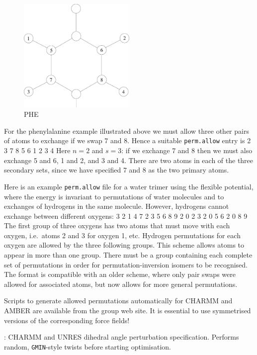 {{{\begin{figure}[hH]
\centerline{\includegraphics[width=0.5\textwidth]{PHE.eps}}
\caption{PHE}
\end{figure}

For the phenylalanine example illustrated above we must allow three other pairs of
atoms to exchange if we swap 7 and 8. Hence a suitable {\tt perm.allow} entry is
{
2 3
7 8 5 6 1 2 3 4
}
Here $n=2$ and $s=3$: if we exchange 7 and 8 then we must also exchange 5 and 6,
1 and 2, and 3 and 4. There are two atoms in each of the three secondary sets, 
since we have specified 7 and 8 as the two primary atoms.

Here is an example {\tt perm.allow} file for a water trimer using
the flexible {} potential, where the energy is invariant to permutations
of water molecules and to exchanges of hydrogens in the same molecule. However,
hydrogens cannot exchange between different oxygens:
{
3 2
1 4 7 2 3 5 6 8 9
2 0 
2 3
2 0 
5 6
2 0 
8 9
}
The first group of three oxygens has two atoms that must move with each oxygen,
i.e.~atoms 2 and 3 for oxygen 1, etc. Hydrogen permutations for each oxygen are
allowed by the three following groups. This scheme allows atoms to appear in more 
than one group. There must be a group containing each complete set of permutations
in order for permutation-inversion isomers to be recognised. The format
is compatible with an older scheme, where only pair swaps were allowed for
associated atoms, but now allows for more general permutations.

Scripts to generate allowed permutations automatically for CHARMM and AMBER are available from
the group web site. It is essential to use symmetrised versions of the corresponding
force fields! 

: CHARMM 
and UNRES dihedral angle perturbation specification.
Performs random, {\tt GMIN}-style twists before starting optimisation.

}}}
